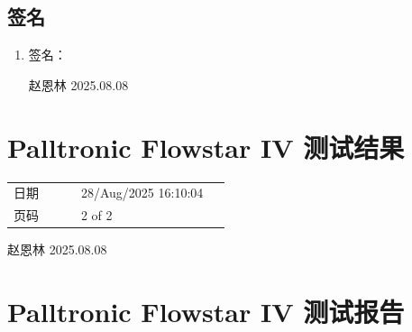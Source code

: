 \documentclass[UTF8,10pt,a4paper,fontset=fandol]{ctexart}
\newcommand{\fieldvalue}[1]{#1}
\newcommand{\handwritten}[1]{#1}
\begin{document}
\subsection{签名}

\begin{enumerate}
\item 签名：

\handwritten{赵恩林 2025.08.08}
\end{enumerate}

\section{Palltronic Flowstar IV 测试结果}

\begin{tabular}{@{}p{0.28\linewidth}p{0.62\linewidth}@{}}
日期 &
\fieldvalue{28/Aug/2025 16:10:04}
\\
页码 &
\fieldvalue{2 of 2}
\\
\end{tabular}

\begin{center}
\end{center}

\handwritten{赵恩林 2025.08.08}


\newpage

\section{Palltronic Flowstar IV 测试报告}
\end{document}
